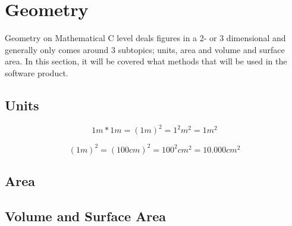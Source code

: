 \section{Geometry}
Geometry on Mathematical C level deals figures in a 2- or 3 dimensional and generally only comes around 3 subtopics; units, area and volume and surface area. In this section, it will be covered what methods that will be used in the software product. 
\subsection{Units}


\[1m*1m = (1m)^2 = 1^2 m^2 = 1m^2\]

\[(1m)^2 = (100cm)^2 = 100^2cm^2=10.000cm^2\]

\subsection{Area}
\subsection{Volume and Surface Area}